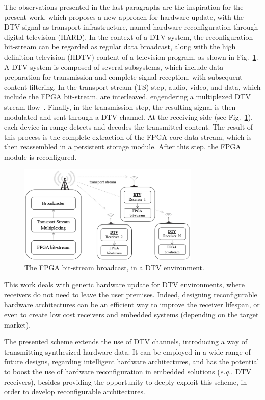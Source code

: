 The observations presented in the last paragraphs are the inspiration for the present work, which proposes a new approach for hardware update, with the DTV signal as transport infrastructure, named hardware reconfiguration through digital television (HARD). In the context of a DTV system, the reconfiguration bit-stream can be regarded as regular data broadcast, along with the high definition television (HDTV) content of a television program, as shown in Fig.~\ref{figure:fig1}. A DTV system is composed of several subsystems, which include data preparation for transmission and complete signal reception, with subsequent content filtering. In the transport stream (TS) step, audio, video, and data, which include the FPGA bit-stream, are interleaved, engendering a multiplexed DTV stream flow~\cite{ref12}. Finally, in the transmission step, the resulting signal is then modulated and sent through a DTV channel. At the receiving side (see Fig.~\ref{figure:fig1}), each device in range detects and decodes the transmitted content. The result of this process is the complete extraction of the FPGA-core data stream, which is then reassembled in a persistent storage module. After this step, the FPGA module is reconfigured.

%
\begin{figure}[ht]
\centering
\includegraphics[width=3.4in]{images/Fig1.eps}
\caption{The FPGA bit-stream broadcast, in a DTV environment.}
\label{figure:fig1}
\end{figure}
%

This work deals with generic hardware update for DTV environments, where receivers do not need to leave the user premises. Indeed, designing reconfigurable hardware architectures can be an efficient way to improve the receiver lifespan, or even to create low cost receivers  and embedded systems (depending on the target market).

The presented scheme extends the use of DTV channels, introducing a way of transmitting synthesized hardware data. It can be employed in a wide range of future designs, regarding intelligent hardware architectures, and has the potential to boost the use of hardware reconfiguration in embedded solutions ({\it e.g.}, DTV receivers), besides providing the opportunity to deeply exploit this scheme, in order to develop reconfigurable architectures.

